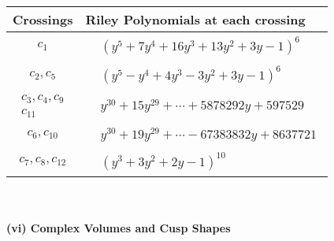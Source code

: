 \documentclass[1p]{elsarticle_modified}
\theoremstyle{definition}
\begin{document}
\begin{tabular}{m{50pt}|m{274pt}}
Crossings & \hspace{64pt}Riley Polynomials at each crossing \\
\hline $$\begin{aligned}c_{1}\end{aligned}$$&$\begin{aligned}
&(y^5+7 y^4+16 y^3+13 y^2+3 y-1)^6
\end{aligned}$\\
\hline $$\begin{aligned}c_{2},c_{5}\end{aligned}$$&$\begin{aligned}
&(y^5- y^4+4 y^3-3 y^2+3 y-1)^6
\end{aligned}$\\
\hline $$\begin{aligned}c_{3},c_{4},c_{9}\\c_{11}\end{aligned}$$&$\begin{aligned}
&y^{30}+15 y^{29}+\cdots+5878292 y+597529
\end{aligned}$\\
\hline $$\begin{aligned}c_{6},c_{10}\end{aligned}$$&$\begin{aligned}
&y^{30}+19 y^{29}+\cdots-67383832 y+8637721
\end{aligned}$\\
\hline $$\begin{aligned}c_{7},c_{8},c_{12}\end{aligned}$$&$\begin{aligned}
&(y^3+3 y^2+2 y-1)^{10}
\end{aligned}$\\
\hline
\end{tabular}\\~\\
\newpage\flushleft \textbf{(vi) Complex Volumes and Cusp Shapes}
\end{document}
